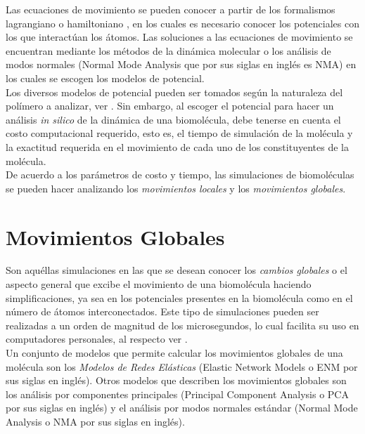 Las ecuaciones de movimiento se pueden conocer a partir de los formalismos lagrangiano o hamiltoniano \cite{Goldstein2001ClassicalMechanics}, en los cuales es necesario conocer los potenciales con los que interact\'{u}an los \'{a}tomos. Las soluciones a las ecuaciones de movimiento se encuentran mediante los m\'{e}todos de la din\'{a}mica molecular o los an\'{a}lisis de modos normales (Normal Mode Analysis que por sus siglas en ingl\'{e}s es NMA) en los cuales se escogen los modelos de potencial.\\

Los diversos modelos de potencial pueden ser tomados seg\'{u}n la naturaleza del pol\'{i}mero a analizar, ver \cite{Lezon2009ElasticViruses}. Sin embargo, al escoger el potencial  para hacer un an\'{a}lisis \textit{in silico} de la din\'{a}mica de una biomol\'{e}cula, debe tenerse en cuenta el costo computacional requerido, esto es, el tiempo de simulaci\'{o}n de la mol\'{e}cula y la exactitud requerida en el movimiento de cada uno de los constituyentes de la mol\'{e}cula.\\

De acuerdo a los par\'{a}metros de costo y tiempo, las simulaciones de biomol\'{e}culas se pueden hacer analizando los \textit{movimientos locales} y los \textit{movimientos globales}.

\section{Movimientos Globales}

Son aqu\'{e}llas simulaciones en las que se desean conocer los \textit{cambios globales} o el aspecto general que excibe el movimiento de una biomol\'{e}cula haciendo simplificaciones, ya sea en los potenciales presentes en la biomol\'{e}cula como en el n\'{u}mero de \'{a}tomos interconectados. Este tipo de simulaciones pueden ser realizadas a un orden de magnitud de los microsegundos, lo cual facilita su uso en computadores personales, al respecto ver \cite{Gur2013GlobalPredictions.}.\\

Un conjunto de modelos que permite calcular los movimientos globales de una mol\'{e}cula son los \textit{Modelos de Redes El\'{a}sticas} (Elastic Network Models o ENM por sus siglas en ingl\'{e}s).
 Otros modelos que describen los movimientos globales son los an\'{a}lisis por componentes principales (Principal Component Analysis o PCA por sus siglas en ingl\'{e}s) y el an\'{a}lisis por modos normales est\'{a}ndar (Normal Mode Analysis o NMA por sus siglas en ingl\'{e}s).
 
